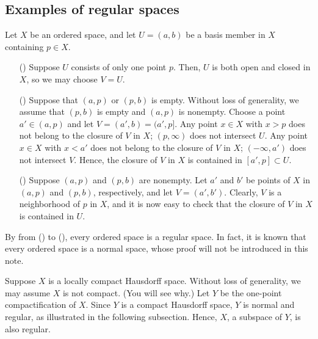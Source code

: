 \subsection{Examples of regular spaces}
\begin{exmp}
    Let $X$ be an ordered space, and let $U=(a, b)$ be a basis member in $X$ containing $p\in X$.
    \begin{enumerate}
        \item[(\romannumeral 1)]
        {
            Suppose $U$ consists of only one point $p$.
            Then, $U$ is both open and closed in $X$, so we may choose $V=U$.
        }
        \item[(\romannumeral 2)]
        {
            Suppose that $(a, p)$ or $(p, b)$ is empty.
            Without loss of generality, we assume that $(p, b)$ is empty and $(a, p)$ is nonempty.
            Choose a point $a'\in(a, p)$ and let $V=(a', b)=(a', p]$.
            Any point $x\in X$ with $x>p$ does not belong to the closure of $V$ in $X$; $(p, \infty)$ does not intersect $U$.
            Any point $x\in X$ with $x<a'$ does not belong to the closure of $V$ in $X$; $(-\infty, a')$ does not intersect $V$.
            Hence, the closure of $V$ in $X$ is contained in $[a', p]\subset U$.
        }
        \item[(\romannumeral 3)]
        {
            Suppose $(a, p)$ and $(p, b)$ are nonempty.
            Let $a'$ and $b'$ be points of $X$ in $(a, p)$ and $(p, b)$, respectively, and let $V=(a', b')$.
            Clearly, $V$ is a neighborhood of $p$ in $X$, and it is now easy to check that the closure of $V$ in $X$ is contained in $U$.
        }
    \end{enumerate}
    By from () to (), every ordered space is a regular space.
    In fact, it is known that every ordered space is a normal space, whose proof will not be introduced in this note.
\end{exmp}

\begin{exmp}
    Suppose $X$ is a locally compact Hausdorff space.
    Without loss of generality, we may assume $X$ is not compact. (You will see why.)
    Let $Y$ be the one-point compactification of $X$.
    Since $Y$ is a compact Hausdorff space, $Y$ is normal and regular, as illustrated in the following subsection.
    Hence, $X$, a subspace of $Y$, is also regular.
\end{exmp}

